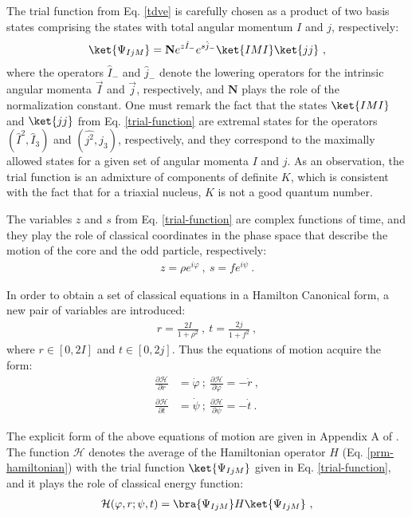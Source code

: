 \documentclass[myclassdoc,debug]{rjparticle}
\begin{document}
The trial function from Eq. \ref{tdve} is carefully chosen as a product of two basis states comprising the states with total angular momentum $I$ and $j$, respectively:
\begin{align}
    \ket{\Psi_{IjM}}=\mathbf{N}e^{z\hat{I}_-}e^{s\hat{j}_-}\ket{IMI}\ket{jj}\ ,
    \label{trial-function}
\end{align}
where the operators $\hat{I}_-$ and $\hat{j}_-$ denote the lowering operators for the intrinsic angular momenta $\vec{I}$ and $\vec{j}$, respectively, and $\mathbf{N}$ plays the role of the normalization constant. One must remark the fact that the states $\ket{IMI}$ and $\ket{jj}$ from Eq. \ref{trial-function} are extremal states for the operators $(\hat{I}^2,\hat{I}_3)$ and $(\hat{j^2},\hat{j_3})$, respectively, and they correspond to the maximally allowed states for a given set of angular momenta $I$ and $j$. As an observation, the trial function is an admixture of components of definite $K$, which is consistent with the fact that for a triaxial nucleus, $K$ is not a good quantum number.

The variables $z$ and $s$ from Eq. \ref{trial-function} are complex functions of time, and they play the role of classical coordinates in the phase space that describe the motion of the core and the odd particle, respectively:
\begin{align}
    z=\rho e^{i\varphi}\ ,\ s=fe^{i\psi}\ .
    \label{complex-variable-set}
\end{align}

In order to obtain a set of classical equations in a Hamilton Canonical form, a new pair of variables are introduced: 
\begin{align}
    r=\frac{2I}{1+\rho^2}\ ,\ t=\frac{2j}{1+f^2}\ ,
\end{align}
where $r\in\left[0,2I\right]$ and $t\in\left[0,2j\right]$. Thus the equations of motion acquire the form:
\begin{align}
    \frac{\partial\mathcal{H}}{\partial r}&=\dot{\varphi}\ ;\ \frac{\partial\mathcal{H}}{\partial \varphi}=-\dot{r}\ , \nonumber\\
    \frac{\partial\mathcal{H}}{\partial t}&=\dot{\psi}\ ;\ \frac{\partial\mathcal{H}}{\partial \psi}=-\dot{t}\ .
    \label{eq-motion}
\end{align}

The explicit form of the above equations of motion are given in Appendix A of \cite{raduta2018wobbling}. The function $\mathcal{H}$ denotes the average of the Hamiltonian operator $H$ (Eq. \ref{prm-hamiltonian}) with the trial function $\ket{\Psi_{IjM}}$ given in Eq. \ref{trial-function}, and it plays the role of classical energy function:
\begin{align}
    \mathcal{H}(\varphi,r;\psi,t)=\bra{\Psi_{IjM}}H\ket{\Psi_{IjM}}\ ,
\end{align}
\end{document}
